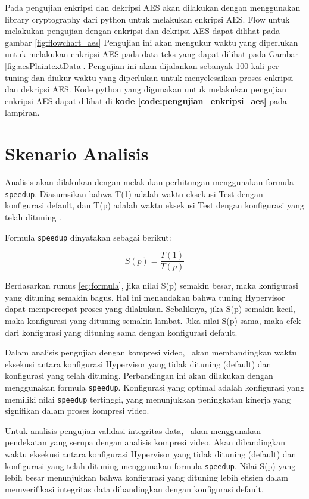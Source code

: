 Pada pengujian enkripsi dan dekripsi AES akan dilakukan dengan menggunakan library cryptography dari python untuk melakukan enkripsi AES. Flow untuk melakukan pengujian dengan enkripsi dan dekripsi AES dapat dilihat pada gambar \ref{fig:flowchart_aes} Pengujian ini akan mengukur waktu yang diperlukan untuk melakukan enkripsi AES pada data teks yang dapat dilihat pada Gambar \ref{fig:aesPlaintextData}. Pengujian ini akan dijalankan sebanyak 100 kali per tuning dan diukur waktu yang diperlukan untuk menyelesaikan proses enkripsi dan dekripsi AES. Kode python yang digunakan untuk melakukan pengujian enkripsi AES dapat dilihat di \textbf{kode \ref{code:pengujian_enkripsi_aes}} pada lampiran.

\section{Skenario Analisis}
Analisis akan dilakukan dengan melakukan perhitungan menggunakan formula \texttt{speedup}. Diasumsikan bahwa T(1) adalah waktu eksekusi Test dengan konfigurasi default, dan T(p) adalah waktu eksekusi Test dengan konfigurasi yang telah dituning \cite{beuwolfCetin}.

Formula \texttt{speedup} dinyatakan sebagai berikut:

\begin{equation}
    S(p) = \frac{T(1)}{T(p)}
    \label{eq:formula}
\end{equation}

Berdasarkan rumus \ref{eq:formula}, jika nilai S(p) semakin besar, maka konfigurasi yang dituning semakin bagus. Hal ini menandakan bahwa tuning Hypervisor dapat mempercepat proses yang dilakukan. Sebaliknya, jika S(p) semakin kecil, maka konfigurasi yang dituning semakin lambat. Jika nilai S(p) sama, maka efek dari konfigurasi yang dituning sama dengan konfigurasi default.

Dalam analisis pengujian dengan kompresi video, \saya\ akan membandingkan waktu eksekusi antara konfigurasi Hypervisor yang tidak dituning (default) dan konfigurasi yang telah dituning. Perbandingan ini akan dilakukan dengan menggunakan formula \texttt{speedup}. Konfigurasi yang optimal adalah konfigurasi yang memiliki nilai \texttt{speedup} tertinggi, yang menunjukkan peningkatan kinerja yang signifikan dalam proses kompresi video.

Untuk analisis pengujian validasi integritas data, \saya\ akan menggunakan pendekatan yang serupa dengan analisis kompresi video. Akan dibandingkan waktu eksekusi antara konfigurasi Hypervisor yang tidak dituning (default) dan konfigurasi yang telah dituning menggunakan formula \texttt{speedup}. Nilai S(p) yang lebih besar menunjukkan bahwa konfigurasi yang dituning lebih efisien dalam memverifikasi integritas data dibandingkan dengan konfigurasi default.


